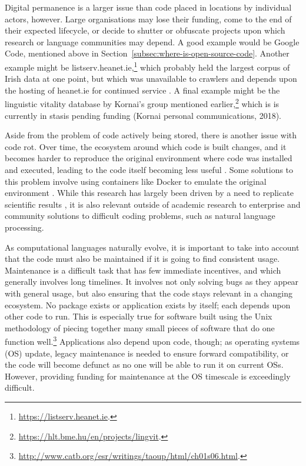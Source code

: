 Digital permanence is a larger issue than code placed in locations by individual actors, however. Large organisations may lose their funding, come to the end of their expected lifecycle, or decide to shutter or obfuscate projects upon which research or language communities may depend. A good example would be Google Code, mentioned above in Section~\ref{subsec:where-is-open-source-code}. Another example might be listserv.heanet.ie,\footnote{\href{https://listserv.heanet.ie}{https://listserv.heanet.ie}. } which probably held the largest corpus of Irish data at one point, but which was unavailable to crawlers and depends upon the hosting of heanet.ie for continued service \citep{scannell2007crubadan}. A final example might be the linguistic vitality database by Kornai's group mentioned earlier,\footnote{\href{https://hlt.bme.hu/en/projects/lingvit}{https://hlt.bme.hu/en/projects/lingvit}. } which is is currently in stasis pending funding (Kornai personal communications, 2018).

Aside from the problem of code actively being stored, there is another issue with code rot. Over time, the ecosystem around which code is built changes, and it becomes harder to reproduce the original environment where code was installed and executed, leading to the code itself becoming less useful \citep{eide2010toward}. Some solutions to this problem involve using containers like Docker to emulate the original environment \citep{boettiger2015introduction}. While this research has largely been driven by a need to replicate scientific results \citep{schwab2000making, barnes2010publish, ince2012case}, it is also relevant outside of academic research to enterprise and community solutions to difficult coding problems, such as natural language processing.

As computational languages naturally evolve, it is important to take into account that the code must also be maintained if it is going to find consistent usage. Maintenance is a difficult task that has few immediate incentives, and which generally involves long timelines. It involves not only solving bugs as they appear with general usage, but also ensuring that the code stays relevant in a changing ecosystem. No package exists or application exists by itself; each depends upon other code to run. This is especially true for software built using the Unix methodology of piecing together many small pieces of software that do one function well.\footnote{\href{http://www.catb.org/esr/writings/taoup/html/ch01s06.html}{http://www.catb.org/esr/writings/taoup/html/ch01s06.html}. } Applications also depend upon code, though; as operating systems (OS) update, legacy maintenance is needed to ensure forward compatibility, or the code will become defunct as no one will be able to run it on current OSs. However, providing funding for maintenance at the OS timescale is exceedingly difficult.

